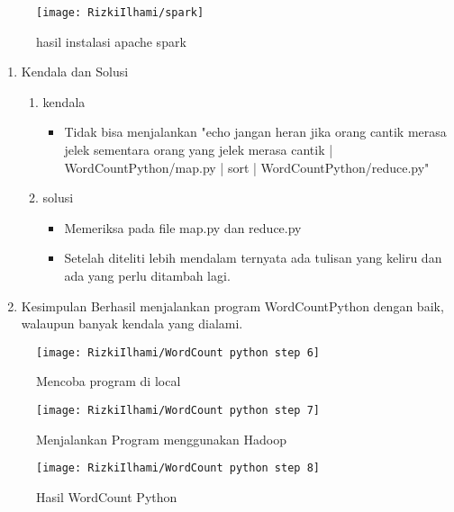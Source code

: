 \begin{figure}[!ht]
\texttt{[image: RizkiIlhami/spark]}
\caption{hasil instalasi apache spark }
\label{gam:hasil instalasi spark}
\end{figure}

\clearpage
{}
\begin{enumerate}
\item Kendala dan Solusi

\begin{enumerate}
    \item kendala
\begin{itemize}
    \item Tidak bisa menjalankan {\color{red}"echo jangan heran jika orang cantik merasa jelek sementara
    orang yang jelek merasa cantik | WordCountPython/map.py |
    sort | WordCountPython/reduce.py"}
\end{itemize}
    \item solusi
\begin{itemize}
    \item Memeriksa pada {\color{red}file map.py} dan {\color{red}reduce.py}
    \item Setelah diteliti lebih mendalam ternyata ada tulisan yang keliru dan ada yang perlu ditambah lagi.
\end{itemize}
\end{enumerate}

\item Kesimpulan
\newline Berhasil menjalankan program WordCountPython dengan baik, walaupun banyak kendala yang dialami.

\end{enumerate}

\begin{figure}[!ht]
    \texttt{[image: RizkiIlhami/WordCount python step 6]}
    \caption{Mencoba program di local }
    \label{gam:hasil WordCountPython}
    \end{figure}

\begin{figure}[!ht]
    \texttt{[image: RizkiIlhami/WordCount python step 7]}
    \caption{Menjalankan Program menggunakan Hadoop }
    \label{gam:hasil WordCountPython}
\end{figure}

\begin{figure}[!ht]
    \texttt{[image: RizkiIlhami/WordCount python step 8]}
    \caption{Hasil WordCount Python }
    \label{gam:hasil WordCountPython}
\end{figure}

